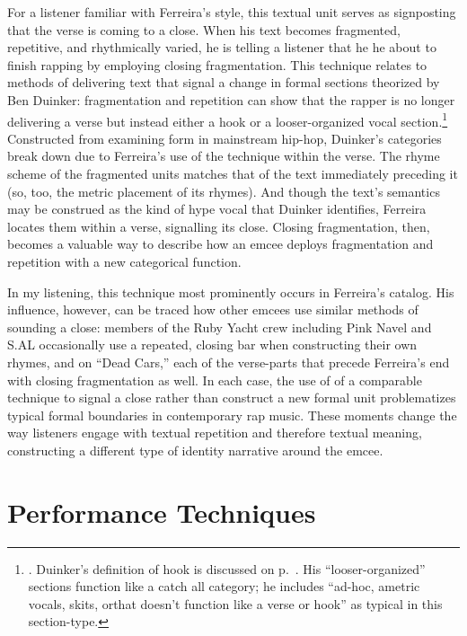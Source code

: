 For a listener familiar with Ferreira's style, this textual unit serves as signposting that the verse is
coming to a close. When his text becomes fragmented, repetitive, and rhythmically varied, he is telling
a listener that he he about to finish rapping by employing closing fragmentation. This technique relates
to methods of delivering text that signal a change in formal sections theorized by Ben Duinker:
fragmentation and repetition can show that the rapper is no longer delivering a verse but instead either
a hook or a looser-organized vocal section.\footnote{
    \autocite[98--101]{benduinkerSongFormMainstreaming2020}. Duinker's definition of hook is 
    discussed on p.~\pageref{duinkerhookdef}. His ``looser-organized'' sections function like
    a catch all category; he includes ``ad-hoc, ametric vocals, skits, or\textellipsis [rapping]
    that doesn't function like a verse or hook'' as typical in this section-type.}
Constructed from examining form in mainstream hip-hop, Duinker's categories break down due to Ferreira's 
use of the technique within the verse. The rhyme scheme of the fragmented units matches that of the text
immediately preceding it (so, too, the metric placement of its rhymes). And though the text's semantics
may be construed as the kind of hype vocal that Duinker identifies, Ferreira locates them within a verse,
signalling its close. Closing fragmentation, then, becomes a valuable way to describe how an emcee deploys
fragmentation and repetition with a new categorical function.

In my listening, this technique most prominently occurs in Ferreira's catalog. His influence, however, can
be traced how other emcees use similar methods of sounding a close: members of the Ruby Yacht crew including
Pink Navel and S.AL occasionally use a repeated, closing bar when constructing their own rhymes, and on ``Dead
Cars,'' each of the verse-parts that precede Ferreira's end with closing fragmentation as well. In each case,
the use of of a comparable technique to signal a close rather than construct a new formal unit problematizes
typical formal boundaries in contemporary rap music. These moments change the way listeners engage with textual
repetition and therefore textual meaning, constructing a different type of identity narrative around the emcee.

\section{Performance Techniques}

